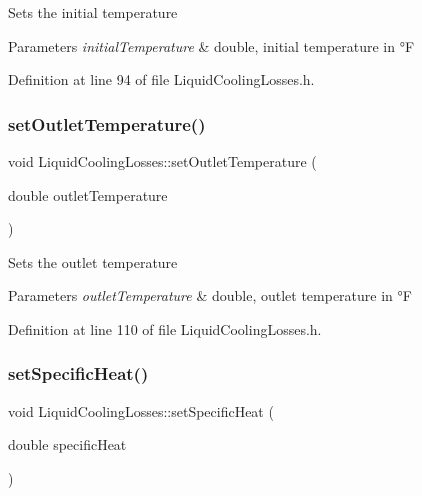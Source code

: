 Sets the initial temperature 
\begin{DoxyParams}{Parameters}
{\em initial\+Temperature} & double, initial temperature in °F \\
\hline
\end{DoxyParams}


Definition at line 94 of file Liquid\+Cooling\+Losses.\+h.

\mbox{\label{class_liquid_cooling_losses_ab8ea8e748853e18fa480afa0b3e417ee}} 
\subsubsection{\texorpdfstring{set\+Outlet\+Temperature()}{setOutletTemperature()}}
{\footnotesize\ttfamily void Liquid\+Cooling\+Losses\+::set\+Outlet\+Temperature (\begin{DoxyParamCaption}\item[{double}]{outlet\+Temperature }\end{DoxyParamCaption})\hspace{0.3cm}{\ttfamily [inline]}}

Sets the outlet temperature 
\begin{DoxyParams}{Parameters}
{\em outlet\+Temperature} & double, outlet temperature in °F \\
\hline
\end{DoxyParams}


Definition at line 110 of file Liquid\+Cooling\+Losses.\+h.

\mbox{\label{class_liquid_cooling_losses_a38ff1ff4dc0de69c72db094bf2259993}} 
\subsubsection{\texorpdfstring{set\+Specific\+Heat()}{setSpecificHeat()}}
{\footnotesize\ttfamily void Liquid\+Cooling\+Losses\+::set\+Specific\+Heat (\begin{DoxyParamCaption}\item[{double}]{specific\+Heat }\end{DoxyParamCaption})\hspace{0.3cm}{\ttfamily [inline]}}

